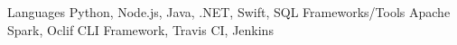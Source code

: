 
\begin{cvskills}
  \cvskill
    {Languages} %
    {Python, Node.js, Java, .NET, Swift, SQL} %
  \cvskill
    {Frameworks/Tools} %
    {Apache Spark, Oclif CLI Framework, Travis CI, Jenkins} %
\end{cvskills}
